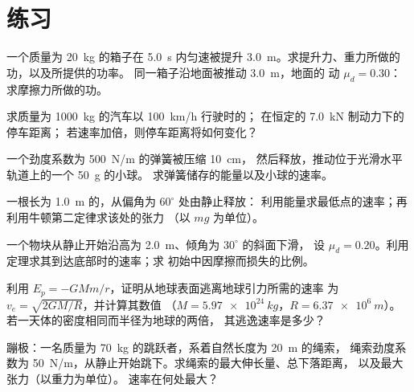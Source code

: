 \section{练习}

\begin{exercise}[$\star$]\label{exo:b1:work-and-energy:1}
一个质量为 \qty{20}{kg} 的箱子在
\qty{5.0}{s} 内匀速被提升 \qty{3.0}{m}。求提升力、重力所做的功，以及所提供的功率。
同一箱子沿地面被推动 \qty{3.0}{m}，地面的
动 $\mu_d = 0.30$：求摩擦力所做的功。
\end{exercise}

\begin{exercise}[$\star$]\label{exo:b1:work-and-energy:2}
求质量为 \qty{1000}{kg} 的汽车以 \qty{100}{km/h} 行驶时的；
在恒定的 \qty{7.0}{kN} 制动力下的停车距离；
若速率加倍，则停车距离将如何变化？
\end{exercise}

\begin{exercise}[$\star$]\label{exo:b1:work-and-energy:3}
一个劲度系数为 \qty{500}{N/m} 的弹簧被压缩 \qty{10}{cm}，
然后释放，推动位于光滑水平轨道上的一个 \qty{50}{g} 的小球。
求弹簧储存的能量以及小球的速率。
\end{exercise}

\begin{exercise}[$\star$]\label{exo:b1:work-and-energy:4}
一根长为 \qty{1.0}{m} 的，从偏角为 $60^\circ$ 处由静止释放：
利用能量求最低点的速率；再利用牛顿第二定律求该处的张力
（以 $mg$ 为单位）。
\end{exercise}

\begin{exercise}[$\star\star$]\label{exo:b1:work-and-energy:5}
一个物块从静止开始沿高为 \qty{2.0}{m}、倾角为 $30^\circ$ 的斜面下滑，
设 $\mu_d = 0.20$。利用定理求其到达底部时的速率；求
初始中因摩擦而损失的比例。
\end{exercise}

\begin{exercise}[$\star\star$]\label{exo:b1:work-and-energy:6}
利用 $E_p = -GMm/r$，证明从地球表面逃离地球引力所需的速率
为 $v_e = \sqrt{2GM/R}$，并计算其数值
（$M = \qty{5.97e24}{kg}$，$R = \qty{6.37e6}{m}$）。若一天体的密度相同而半径为地球的两倍，
其逃逸速率是多少？
\end{exercise}

\begin{exercise}[$\star\star$]\label{exo:b1:work-and-energy:7}
蹦极：一名质量为 \qty{70}{kg} 的跳跃者，系着自然长度为 \qty{20}{m} 的绳索，
绳索劲度系数为 \qty{50}{N/m}，从静止开始跳下。求绳索的最大伸长量、总下落距离，
以及最大张力（以重力为单位）。
速率在何处最大？
\end{exercise}

